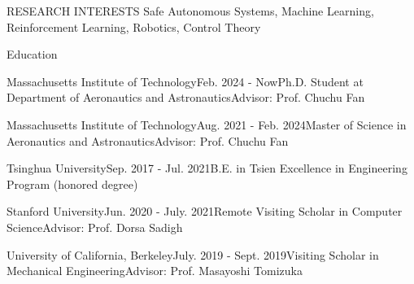 \documentclass{resume} %
\begin{document}
	\begin{rSection}{RESEARCH INTERESTS}
		Safe Autonomous Systems, Machine Learning, Reinforcement Learning, Robotics, Control Theory
	\end{rSection}

	\begin{rSection}{Education} 		
		\begin{rSubsection2}{Massachusetts Institute of Technology}{Feb. 2024 - Now}{Ph.D. Student at Department of Aeronautics and Astronautics}{Advisor: Prof. Chuchu Fan}
		\end{rSubsection2}

		\begin{rSubsection2}{Massachusetts Institute of Technology}{Aug. 2021 - Feb. 2024}{Master of Science in Aeronautics and Astronautics}{Advisor: Prof. Chuchu Fan}
		\end{rSubsection2} 
	
		\begin{rSubsection2}{Tsinghua University}{Sep. 2017 - Jul. 2021}{B.E. in Tsien Excellence in Engineering Program (honored degree)}{\\} 
		\end{rSubsection2}
		\vspace{-10pt}
        
        \begin{rSubsection2}{Stanford University}{Jun. 2020 - July. 2021}{Remote Visiting Scholar in Computer Science}{Advisor: Prof. Dorsa Sadigh}
		\end{rSubsection2}

		\begin{rSubsection2}{University of California, Berkeley}{July. 2019 - Sept. 2019}{Visiting Scholar in Mechanical Engineering}{Advisor: Prof. Masayoshi Tomizuka}
		\end{rSubsection2}
	\end{rSection}
\end{document}
